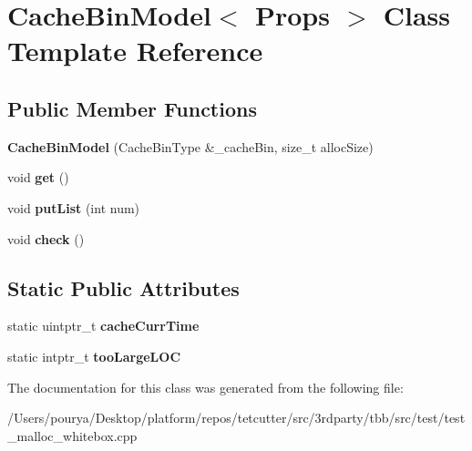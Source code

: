 \hypertarget{classCacheBinModel}{}\section{Cache\+Bin\+Model$<$ Props $>$ Class Template Reference}
\label{classCacheBinModel}
\subsection*{Public Member Functions}
\begin{DoxyCompactItemize}
\item 
\hypertarget{classCacheBinModel_a4f36f776d0835863ba894b86ce9da63c}{}{\bfseries Cache\+Bin\+Model} (Cache\+Bin\+Type \&\+\_\+cache\+Bin, size\+\_\+t alloc\+Size)\label{classCacheBinModel_a4f36f776d0835863ba894b86ce9da63c}

\item 
\hypertarget{classCacheBinModel_aa5884166e73a9a280f3ae13793e9e24d}{}void {\bfseries get} ()\label{classCacheBinModel_aa5884166e73a9a280f3ae13793e9e24d}

\item 
\hypertarget{classCacheBinModel_ab2461fdd3cb66c04a5d268a148d46df4}{}void {\bfseries put\+List} (int num)\label{classCacheBinModel_ab2461fdd3cb66c04a5d268a148d46df4}

\item 
\hypertarget{classCacheBinModel_a7b1a4f0f401b4a8ee3a56af67a06497d}{}void {\bfseries check} ()\label{classCacheBinModel_a7b1a4f0f401b4a8ee3a56af67a06497d}

\end{DoxyCompactItemize}
\subsection*{Static Public Attributes}
\begin{DoxyCompactItemize}
\item 
\hypertarget{classCacheBinModel_ab328b04ee9fbd2039854e16ee4b471cd}{}static uintptr\+\_\+t {\bfseries cache\+Curr\+Time}\label{classCacheBinModel_ab328b04ee9fbd2039854e16ee4b471cd}

\item 
\hypertarget{classCacheBinModel_a9ac531be30c35d758addf12740fb436a}{}static intptr\+\_\+t {\bfseries too\+Large\+L\+O\+C}\label{classCacheBinModel_a9ac531be30c35d758addf12740fb436a}

\end{DoxyCompactItemize}


The documentation for this class was generated from the following file\+:\begin{DoxyCompactItemize}
\item 
/\+Users/pourya/\+Desktop/platform/repos/tetcutter/src/3rdparty/tbb/src/test/test\+\_\+malloc\+\_\+whitebox.\+cpp\end{DoxyCompactItemize}
